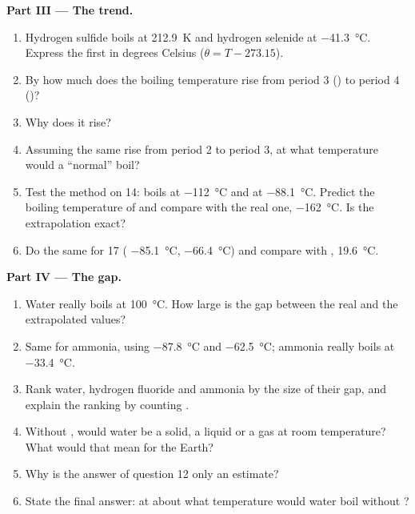 \begin{problem}
\medskip
\noindent\textbf{Part III --- The trend.}
\begin{enumerate}[resume]
  \item Hydrogen sulfide boils at \qty{212.9}{K} and hydrogen selenide at
        \qty{-41.3}{\celsius}. Express the first in degrees Celsius
        ($\theta = T - 273.15$).
  \item By how much does the boiling temperature rise from period 3
        () to period 4 ()?
  \item Why does it rise?
  \item Assuming the same rise from period 2 to period 3, at what
        temperature would a ``normal''  boil?
  \item Test the method on  14:  boils at
        \qty{-112}{\celsius} and  at \qty{-88.1}{\celsius}.
        Predict the boiling temperature of  and compare with the
        real one, \qty{-162}{\celsius}. Is the extrapolation exact?
  \item Do the same for  17 ( \qty{-85.1}{\celsius},
         \qty{-66.4}{\celsius}) and compare with ,
        \qty{19.6}{\celsius}.
\end{enumerate}

\medskip
\noindent\textbf{Part IV --- The gap.}
\begin{enumerate}[resume]
  \item Water really boils at \qty{100}{\celsius}. How large is the gap
        between the real and the extrapolated values?
  \item Same for ammonia, using  \qty{-87.8}{\celsius} and
         \qty{-62.5}{\celsius}; ammonia really boils at
        \qty{-33.4}{\celsius}.
  \item Rank water, hydrogen fluoride and ammonia by the size of their
        gap, and explain the ranking by counting .
  \item Without , would water be a solid, a liquid or a gas
        at room temperature? What would that mean for the Earth?
  \item Why is the answer of question 12 only an estimate?
  \item State the final answer: at about what temperature would water
        boil without ?
\end{enumerate}
\end{problem}
